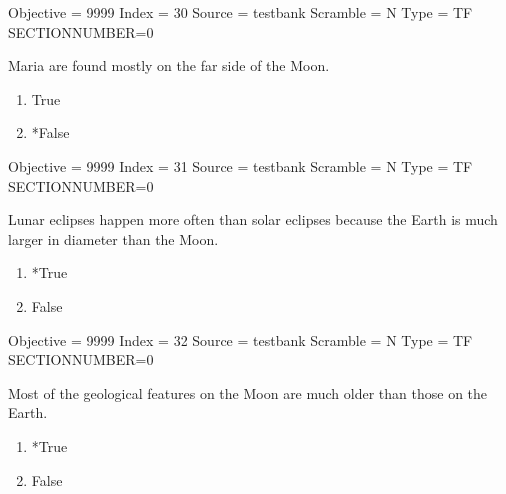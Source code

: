 \documentclass[11pt]{article}
\begin{document}
\begin{enumerate}
\begin{minipage}{\textwidth}
\begin{minipage}{\textwidth}
Objective = 9999
Index = 30
Source = testbank
Scramble = N
Type = TF
SECTIONNUMBER=0
\end{minipage}
\end{minipage}
\vskip 0.20in

\begin{minipage}{\textwidth}
\begin{minipage}{\textwidth}
\item Maria are found mostly on the far side of the Moon.
\begin{multicols}{3}
\begin{enumerate} 
\setlength{\itemsep}{1pt} 
\setlength{\parskip}{0pt} 
\setlength{\parsep}{0pt}
\setlength{\multicolsep}{1pt} 
\item True
\item *False
\end{enumerate} 
\vfill 
\end{multicols}

Objective = 9999
Index = 31
Source = testbank
Scramble = N
Type = TF
SECTIONNUMBER=0
\end{minipage}
\end{minipage}
\vskip 0.20in

\begin{minipage}{\textwidth}
\begin{minipage}{\textwidth}
\item Lunar eclipses happen more often than solar eclipses because the Earth is much larger in diameter than the Moon.
\begin{multicols}{3}
\begin{enumerate} 
\setlength{\itemsep}{1pt} 
\setlength{\parskip}{0pt} 
\setlength{\parsep}{0pt}
\setlength{\multicolsep}{1pt} 
\item *True
\item False
\end{enumerate} 
\vfill 
\end{multicols}

Objective = 9999
Index = 32
Source = testbank
Scramble = N
Type = TF
SECTIONNUMBER=0
\end{minipage}
\end{minipage}
\vskip 0.20in

\begin{minipage}{\textwidth}
\begin{minipage}{\textwidth}
\item Most of the geological features on the Moon are much older than those on the Earth.
\begin{multicols}{3}
\begin{enumerate} 
\setlength{\itemsep}{1pt} 
\setlength{\parskip}{0pt} 
\setlength{\parsep}{0pt}
\setlength{\multicolsep}{1pt} 
\item *True
\item False
\end{enumerate} 
\vfill 
\end{multicols}


\end{minipage}
\end{minipage}
\end{enumerate}
\end{document}
